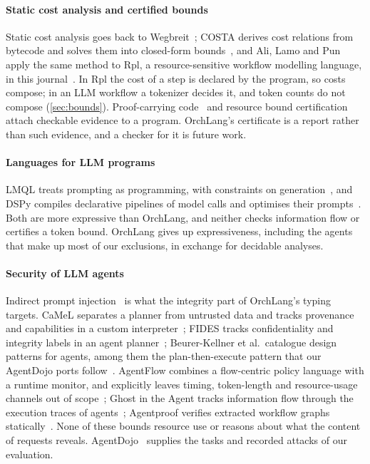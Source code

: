 \paragraph{Static cost analysis and certified bounds} Static cost analysis goes back to
Wegbreit~\cite{Wegbreit1975}; COSTA derives cost relations from bytecode and solves them
into closed-form bounds~\cite{Albert2012CostBytecode}, and Ali, Lamo and Pun apply the
same method to Rpl, a resource-sensitive workflow modelling language, in this
journal~\cite{ali2023cost}. In Rpl the cost of a step is declared by the program, so costs
compose; in an LLM workflow a tokenizer decides it, and token counts do not compose
(\cref{sec:bounds}). Proof-carrying code~\cite{Necula1997PCC} and resource bound
certification~\cite{CraryWeirich2000} attach checkable evidence to a program. OrchLang's
certificate is a report rather than such evidence, and a checker for it is future work.

\paragraph{Languages for LLM programs} LMQL treats prompting as programming, with
constraints on generation~\cite{BeurerKellner2023LMQL}, and DSPy compiles declarative
pipelines of model calls and optimises their prompts~\cite{Khattab2024DSPy}. Both are
more expressive than OrchLang, and neither checks information flow or certifies a token
bound. OrchLang gives up expressiveness, including the agents that make up most of our
exclusions, in exchange for decidable analyses.

\paragraph{Security of LLM agents} Indirect prompt injection~\cite{greshake2023not} is what
the integrity part of OrchLang's typing targets. CaMeL separates a planner from untrusted
data and tracks provenance and capabilities in a custom
interpreter~\cite{debenedetti2026defeating}; FIDES tracks confidentiality and integrity
labels in an agent planner~\cite{costa2025securing}; Beurer-Kellner et al.\ catalogue
design patterns for agents, among them the plan-then-execute pattern that our AgentDojo
ports follow~\cite{beurerkellner2025design}. AgentFlow combines a flow-centric policy
language with a runtime monitor, and explicitly leaves timing, token-length and
resource-usage channels out of scope~\cite{ammanaghattashivakumar2026agentflow}; Ghost in
the Agent tracks information flow through the execution traces of
agents~\cite{cai2026ghost}; Agentproof verifies extracted workflow graphs
statically~\cite{xavier2026agentproof}. None of these bounds resource use or reasons
about what the content of requests reveals. AgentDojo~\cite{debenedetti2024agentdojo}
supplies the tasks and recorded attacks of our evaluation.


